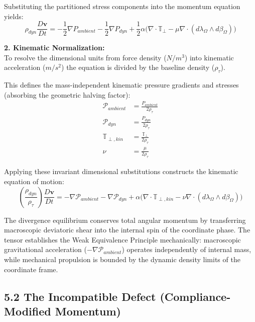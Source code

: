 Substituting the partitioned stress components into the momentum equation yields: 
\begin{equation}
    \rho_{dyn} \frac{D\mathbf{v}}{Dt} = -\frac{1}{2}\nabla P_{ambient} - \frac{1}{2}\nabla P_{dyn} + \frac{1}{2}\alpha \big( \nabla \cdot \mathbb{T}_{\perp} - \mu \nabla \cdot (d\lambda_\Omega \wedge d\beta_\Omega) \big) 
\end{equation}

\textbf{2. Kinematic Normalization:} \\ 
To resolve the dimensional units from force density ($N/m^3$) into kinematic acceleration ($m/s^2$) the equation is divided by the baseline density ($\rho_\tau$). 

This defines the mass-independent kinematic pressure gradients and stresses (absorbing the geometric halving factor):
\begin{align}
    \mathcal{P}_{ambient} &= \frac{P_{ambient}}{2\rho_\tau} \\ 
    \mathcal{P}_{dyn} &= \frac{P_{dyn}}{2\rho_\tau} \\ 
    \mathbb{T}_{\perp, kin} &= \frac{\mathbb{T}_{\perp}}{2\rho_\tau} \\ 
    \nu &= \frac{\mu}{2\rho_\tau} 
\end{align}

Applying these invariant dimensional substitutions constructs the kinematic equation of motion:
\begin{equation}
    \left( \frac{\rho_{dyn}}{\rho_\tau} \right) \frac{D\mathbf{v}}{Dt} = -\nabla \mathcal{P}_{ambient} - \nabla \mathcal{P}_{dyn} + \alpha \big( \nabla \cdot \mathbb{T}_{\perp, kin} - \nu \nabla \cdot (d\lambda_\Omega \wedge d\beta_\Omega) \big) \label{eq:kinematic_ns} 
\end{equation}



The divergence equilibrium conserves total angular momentum by transferring macroscopic deviatoric shear into the internal spin of the coordinate phase. The tensor establishes the Weak Equivalence Principle mechanically: macroscopic gravitational acceleration ($-\nabla \mathcal{P}_{ambient}$) operates independently of internal mass, while mechanical propulsion is bounded by the dynamic density limits of the coordinate frame.


\subsection*{5.2 The Incompatible Defect (Compliance-Modified Momentum)}


